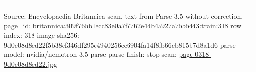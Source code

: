 \documentclass[10pt]{article}
\begin{document}
\vfill\par\noindent\rule{\linewidth}{0.4pt}\par
{\scriptsize\color{gray}\noindent Source: Encyclopaedia Britannica scan, text from Parse 3.5 without correction. page\_id: britannica:309f765b1ecc83e0a7f7762e44b4a927a7555443:train:318 \quad row index: 318 \quad image sha256: 9d0e08d8ed22f5b38cf346df295e4940256ee6904fa14f8fb66cb815b7d8a1d6 \quad parse model: nvidia/nemotron-3.5-parse \quad parse finish: stop \quad scan: \href{../scans/page-0318-9d0e08d8ed22.jpg}{page-0318-9d0e08d8ed22.jpg}\par}
\end{document}
